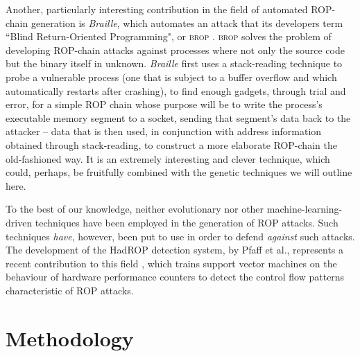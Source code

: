 Another, particularly interesting contribution in the field of
automated ROP-chain generation is \emph{Braille}, which
automates an attack that its developers term ``Blind
Return-Oriented Programming", or \textsc{brop} \cite{bittau14}.
\textsc{brop} solves the problem of developing ROP-chain
attacks against processes where not only the source code but the
binary itself in unknown. %
\emph{Braille} first uses a stack-reading technique to probe a
vulnerable process (one that is subject to a buffer overflow and
which automatically restarts after crashing), to find enough
gadgets, through trial and error, for a simple ROP chain
whose purpose will be to write the process's executable memory
segment to a socket, sending that segment's data back to the
attacker -- data that is then used, in conjunction with address
information obtained through stack-reading, to construct a more
elaborate ROP-chain the old-fashioned way. It is an
extremely interesting and clever technique, which could, perhaps,
be fruitfully combined with the genetic techniques we will
outline here. 

To the best of our knowledge, neither evolutionary nor other
machine-learning-driven techniques have been employed in the
generation of ROP attacks. Such techniques \emph{have}, however, been
put to use in order to defend \emph{against} such attacks. The
development of the HadROP detection system, by Pfaff et al.,
represents a recent contribution to this field \cite{pfaff15}, which
trains support vector machines on the behaviour of hardware
performance counters to detect the control flow patterns 
characteristic of ROP attacks.

\section{Methodology}\label{sec:methodology}

